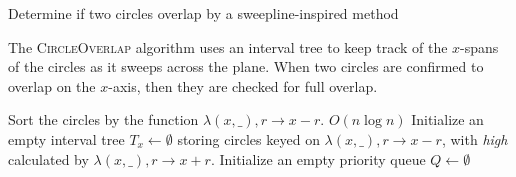\documentclass{article}
\DeclareMathOperator{\Dequeue}{\mathtt{dequeue}}
\DeclareMathOperator{\Peek}{\mathtt{peek}}
\DeclareMathOperator{\Remove}{\mathtt{remove}}
\DeclareMathOperator{\Intersects}{\mathtt{intersects}}
\begin{document}
\begin{algorithm}
    \caption{Determine if two circles overlap by a sweepline-inspired method}
    \begin{algorithmic}
        \item[]
            The \textsc{CircleOverlap} algorithm uses an interval tree to keep
            track of the $x$-spans of the circles as it sweeps across the
            plane. When two circles are confirmed to overlap on the $x$-axis,
            then they are checked for full overlap.



            \State Sort the circles by the function $\lambda (x, \_), r \to x - r$.
            \Comment $O(n \log n)$
            \State Initialize an empty interval tree $T_x \gets \emptyset$
            storing circles keyed on $\lambda (x, \_), r \to x - r$, with
            \emph{high} calculated by $\lambda (x, \_), r \to x + r$.
            \State Initialize an empty priority queue $Q \gets \emptyset$

\end{algorithmic}
\end{algorithm}
\end{document}
